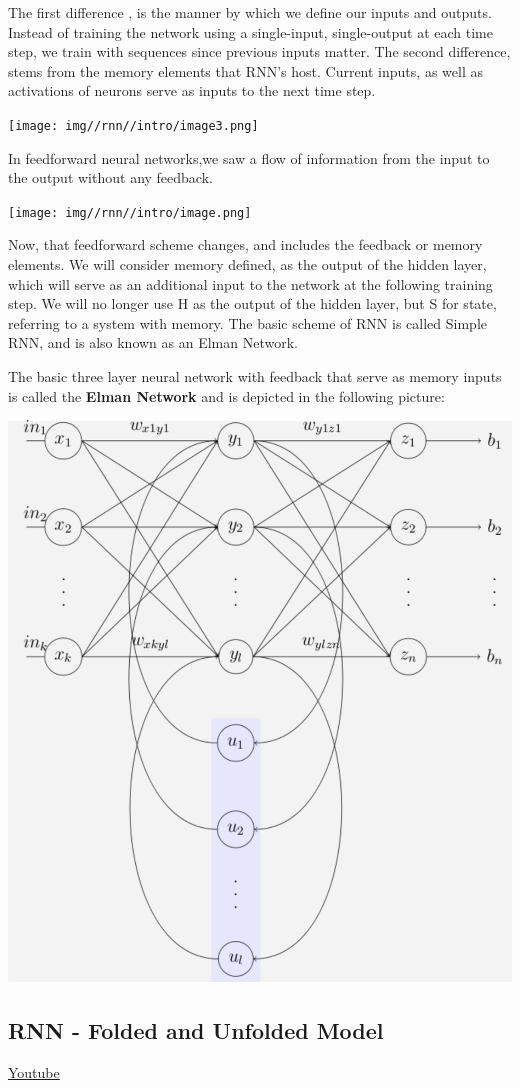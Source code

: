 The first difference , is the manner by which we define our inputs and outputs. Instead of training the network using a single-input, single-output at each time step, we train with sequences since previous inputs matter. The second difference, stems from the memory elements that RNN's host. Current inputs, as well as activations of neurons serve as inputs to the next time step.

\texttt{[image: img//rnn//intro/image3.png]}

In feedforward neural networks,we saw a flow of information from the input to the output without any feedback.

\texttt{[image: img//rnn//intro/image.png]}

Now, that feedforward scheme changes, and includes the feedback or memory elements. We will consider memory defined, as the output of the hidden layer, which will serve as an additional input to the network at the following training step. We will no longer use H as the output of the hidden layer, but S for state, referring to a system with memory. The basic scheme of RNN is called Simple RNN, and is also known as an Elman Network. \newline

The basic three layer neural network with feedback that serve as memory inputs is called the \textbf{Elman Network} and is depicted in the following picture:

\includegraphics[width=0.5\linewidth]{img//rnn//intro/screen-shot-2017-11-06-at-1.40.14-pm.png}

\subsection{RNN - Folded and Unfolded Model}
\href{https://www.youtube.com/watch?v=wsif3p5t7CI&ab_channel=Udacity}{Youtube} \newline

